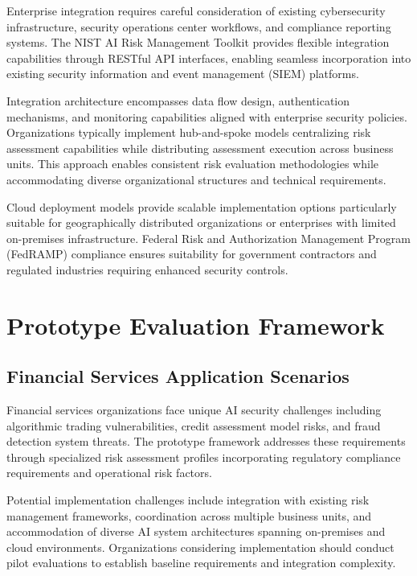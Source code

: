 \documentclass[11pt,letterpaper]{article}
\begin{document}
Enterprise integration requires careful consideration of existing cybersecurity infrastructure, security operations center workflows, and compliance reporting systems. The NIST AI Risk Management Toolkit provides flexible integration capabilities through RESTful API interfaces, enabling seamless incorporation into existing security information and event management (SIEM) platforms.

Integration architecture encompasses data flow design, authentication mechanisms, and monitoring capabilities aligned with enterprise security policies. Organizations typically implement hub-and-spoke models centralizing risk assessment capabilities while distributing assessment execution across business units. This approach enables consistent risk evaluation methodologies while accommodating diverse organizational structures and technical requirements.

Cloud deployment models provide scalable implementation options particularly suitable for geographically distributed organizations or enterprises with limited on-premises infrastructure. Federal Risk and Authorization Management Program (FedRAMP) compliance ensures suitability for government contractors and regulated industries requiring enhanced security controls.

\section{Prototype Evaluation Framework}

\subsection{Financial Services Application Scenarios}

Financial services organizations face unique AI security challenges including algorithmic trading vulnerabilities, credit assessment model risks, and fraud detection system threats. The prototype framework addresses these requirements through specialized risk assessment profiles incorporating regulatory compliance requirements and operational risk factors.

Potential implementation challenges include integration with existing risk management frameworks, coordination across multiple business units, and accommodation of diverse AI system architectures spanning on-premises and cloud environments. Organizations considering implementation should conduct pilot evaluations to establish baseline requirements and integration complexity.
\end{document}
